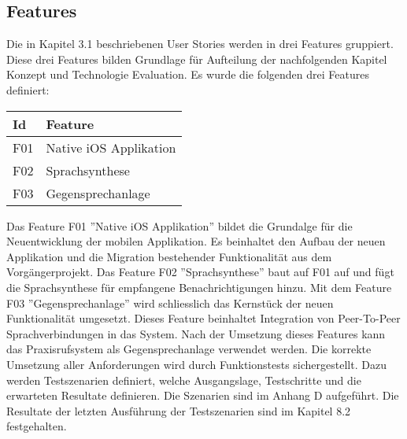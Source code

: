 \subsection{Features}

Die in Kapitel 3.1 beschriebenen User Stories werden in drei Features gruppiert.
Diese drei Features bilden Grundlage für Aufteilung der nachfolgenden Kapitel Konzept und Technologie Evaluation.
Es wurde die folgenden drei Features definiert:

\begin{table}[h]
    \centering
    \begin{tabular}{|l|p{15cm}|}
        \hline
        \textbf{Id} & \textbf{Feature}                        \\
        \hline
        F01         & Native iOS Applikation                 \\
        \hline
        F02         & Sprachsynthese                          \\
        \hline
        F03         & Gegensprechanlage                       \\
        \hline
    \end{tabular}\label{tab:features}
\end{table}

Das Feature F01 ''Native iOS Applikation'' bildet die Grundalge für die Neuentwicklung der mobilen Applikation.
Es beinhaltet den Aufbau der neuen Applikation und die Migration bestehender Funktionalität aus dem Vorgängerprojekt.
Das Feature F02 ''Sprachsynthese'' baut auf F01 auf und fügt die Sprachsynthese für empfangene Benachrichtigungen hinzu.
Mit dem Feature F03 ''Gegensprechanlage'' wird schliesslich das Kernstück der neuen Funktionalität umgesetzt.
Dieses Feature beinhaltet Integration von Peer-To-Peer Sprachverbindungen in das System.
Nach der Umsetzung dieses Features kann das Praxisrufsystem als Gegensprechanlage verwendet werden.
Die korrekte Umsetzung aller Anforderungen wird durch Funktionstests sichergestellt.
Dazu werden Testszenarien definiert, welche Ausgangslage, Testschritte und die erwarteten Resultate definieren.
Die Szenarien sind im Anhang D aufgeführt.
Die Resultate der letzten Ausführung der Testszenarien sind im Kapitel 8.2 festgehalten.

\clearpage
